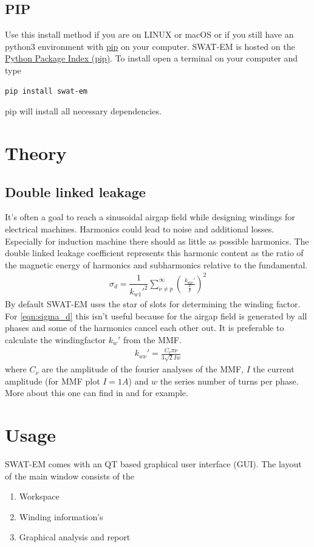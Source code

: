 \documentclass[]{scrreprt}
\begin{document}
\section{PIP}
%
Use this install method if you are on LINUX or macOS or if you still have an python3 environment with
\href{https://pypi.org/project/pip/}{pip} on your computer. SWAT-EM is hosted on the 
\href{https://pypi.org/}{Python Package Index (pip)}. To install open a terminal on your computer
and type 
\begin{lstlisting}
pip install swat-em
\end{lstlisting}
pip will install all necessary dependencies. 
%
%
\chapter{Theory}
\section{Double linked leakage}
It's often a goal to reach a sinusoidal airgap field while designing windings for 
electrical machines. Harmonics could lead to noise and additional losses. Especially
for induction machine there should as little as possible harmonics. The double linked
leakage coefficient represents this harmonic content as the ratio of the magnetic
energy of harmonics and subharmonics relative to the fundamental. 
\begin{align}
    \sigma_d = \dfrac{1}{k_{w1}'^2} \sum_{\nu \neq p}^{\infty} \left( \
    \frac{k_{w\nu}'}{\frac{\nu}{p}} \right)^2  \label{eqn:sigma_d}
\end{align} 
%
By default SWAT-EM uses the star of slots for determining the winding factor. For
\eqref{eqn:sigma_d} this isn't useful because for the airgap field is generated by
all phases and some of the harmonics cancel each other out. It is preferable to calculate
the windingfactor $k_w'$ from the MMF.
\begin{align}
    k_{w\nu}' = \frac{C_\nu \pi \nu}{3 \sqrt{2} I w}
\end{align} 
%
where $C_\nu$ are the amplitude of the fourier analyses of the MMF, $I$ the current amplitude
(for MMF plot $I=1A$) and $w$ the series number of turns per phase. More about this one 
can find in \cite{Gottkehaskamp1} and \cite{Oberretl1965} for example.
%
%
%
\chapter{Usage}
%
SWAT-EM comes with an QT based graphical user interface (GUI). The layout of the main window consists of the
\begin{enumerate}
 \item Workspace
 \item Winding information's
 \item Graphical analysis and report
\end{enumerate}
\end{document}
